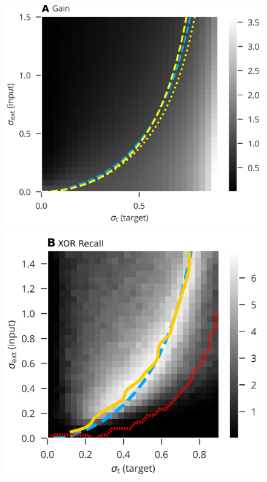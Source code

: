 \documentclass[a4paper,12pt]{article}
\begin{document}
\begin{figure}[t!]
	\centering
	\begin{minipage}[t]{0.46\textwidth}
		\centering
		\includegraphics[width=\textwidth]{./plots/theory_simulation_2.png}
	\end{minipage}
	\begin{minipage}[t]{0.42\textwidth}
		\centering
		\includegraphics[width=\textwidth]{./plots/xor.png}

\end{minipage}
\end{figure}
\end{document}
